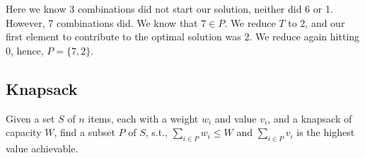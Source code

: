 \noindent
Here we know 3 combinations did not start our solution, neither did 6 or 1. However, 7 combinations did.
We know that $7\in P$. We reduce $T$ to $2$, and our first element to contribute to the optimal solution was 2. 
We reduce again hitting $0$, hence, $P=\{7,2\}$.

\newpage
\subsection{Knapsack}

\begin{Def}

    Given a set $S$ of $n$ items, each with a weight $w_i$ and value $v_i$, and a knapsack of capacity $W$, find a subset
    $P$ of $S$, s.t., $\sum_{i\in P}w_i\leq W$ and $\sum_{i\in P}v_i$ is the highest value achievable.
\end{Def}   

